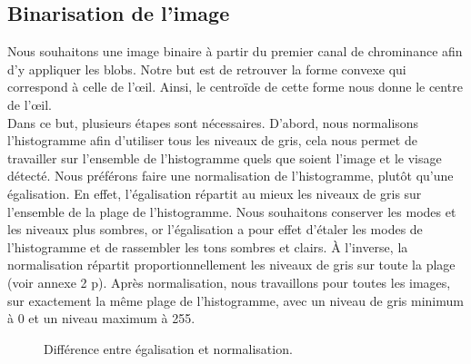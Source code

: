 \subsection{Binarisation de l'image}
Nous souhaitons une image binaire à partir du premier canal de chrominance afin d'y appliquer les blobs. 
Notre but est de retrouver la forme convexe qui correspond à celle de l'œil. Ainsi, le centroïde de cette 
forme nous donne le centre de l'œil.\\

Dans ce but, plusieurs étapes sont nécessaires. D'abord, nous normalisons l'histogramme afin d'utiliser 
tous les niveaux de gris, cela nous permet de travailler sur l'ensemble de l'histogramme quels que soient
l'image et le visage détecté. Nous préférons faire une normalisation de l'histogramme, plutôt qu'une 
égalisation. En effet, l'égalisation répartit au mieux les niveaux de gris sur l'ensemble de 
la plage de l'histogramme. Nous souhaitons conserver les modes et les niveaux plus sombres, or l'égalisation 
a pour effet d'étaler les modes de l'histogramme et de rassembler les tons sombres et clairs. À l'inverse, 
la normalisation répartit proportionnellement les niveaux de gris sur toute la plage (voir annexe 2 p\pageref{compHist}). Après 
normalisation, nous travaillons pour toutes les images, sur exactement la même plage de l'histogramme, avec un niveau de 
gris minimum à 0 et un niveau maximum à 255.\\

\begin{figure}[H]
  \centering
  \caption{Différence entre égalisation et normalisation.}
\end{figure}

